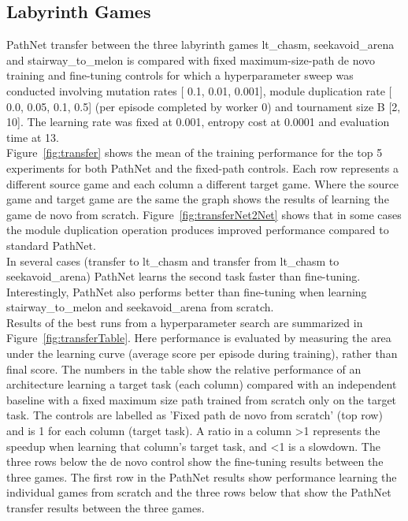 \documentclass{sig-alternate-05-2015}
\begin{document}
\subsection{Labyrinth Games}

PathNet transfer between the three labyrinth games lt\_chasm, seekavoid\_arena and stairway\_to\_melon is compared with fixed maximum-size-path de novo training and fine-tuning controls for which a hyperparameter sweep was conducted involving mutation rates [ 0.1, 0.01, 0.001], module duplication rate [ 0.0, 0.05, 0.1, 0.5] (per episode completed by worker 0) and tournament size B [2, 10]. The learning rate was fixed at 0.001, entropy cost at 0.0001 and evaluation time  at 13.\\

Figure~\ref{fig:transfer} shows the mean of the training performance for the top 5 experiments for both PathNet and the fixed-path controls. Each row represents a different source game and each column a different target game. Where the source game and target game are the same the graph shows the results of learning the game de novo from scratch. Figure~\ref{fig:transferNet2Net} shows that in some cases the module duplication operation produces improved performance compared to standard PathNet. \\

In several cases (transfer to lt\_chasm and transfer from lt\_chasm to seekavoid\_arena) PathNet learns the second task faster than fine-tuning. Interestingly, PathNet also performs better than fine-tuning when learning stairway\_to\_melon and seekavoid\_arena from scratch.\\

Results of the best runs from a hyperparameter search are summarized in Figure~\ref{fig:transferTable}. Here performance is evaluated by measuring the area under the learning curve (average score per episode during training), rather than final score. The numbers in the table show the relative performance of an architecture learning a target task (each column) compared with an independent baseline with a fixed maximum size path trained from scratch only on the target task. The controls are labelled as 'Fixed path de novo from scratch' (top row) and is 1 for each column (target task). A ratio in a column >1 represents the speedup when learning that column's target task, and <1 is a slowdown. The three rows below the de novo control show the fine-tuning results between the three games. The first row in the PathNet results show performance learning the individual games from scratch and the three rows below that show the PathNet transfer results between the three games.\\
\end{document}

